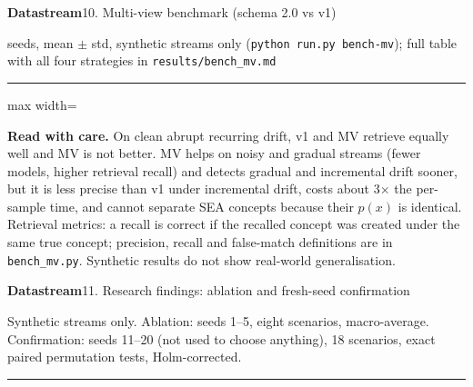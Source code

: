 \documentclass[10pt]{article}
\newcommand{\pagetitle}[2]{%
  {\Huge\bfseries Datastream}\hfill{\large #1}\par\vspace{2pt}
  {\large\color{ink!70} #2}\par\vspace{8pt}\hrule\vspace{14pt}}
\begin{document}
\pagetitle{10. Multi-view benchmark (schema 2.0 vs v1)}{\mvseeds{} seeds, mean $\pm$ std, synthetic streams only (\texttt{python run.py bench-mv}); full table with all four strategies in \texttt{results/bench\_mv.md}}

\begin{center}
\begin{adjustbox}{max width=\textwidth}

\end{adjustbox}
\end{center}
\vspace{6pt}
\begin{center}\end{center}
\vfill
{\footnotesize\color{ink!70}\textbf{Read with care.} On clean abrupt recurring drift, v1 and MV retrieve equally well and MV is not better. MV helps on noisy and gradual streams (fewer models, higher retrieval recall) and detects gradual and incremental drift sooner, but it is less precise than v1 under incremental drift, costs about 3$\times$ the per-sample time, and cannot separate SEA concepts because their $p(x)$ is identical. Retrieval metrics: a recall is correct if the recalled concept was created under the same true concept; precision, recall and false-match definitions are in \texttt{bench\_mv.py}. Synthetic results do not show real-world generalisation.}
\clearpage

\pagetitle{11. Research findings: ablation and fresh-seed confirmation}{Synthetic streams only. Ablation: seeds 1--5, eight scenarios, macro-average. Confirmation: seeds 11--20 (not used to choose anything), 18 scenarios, exact paired permutation tests, Holm-corrected.}
\end{document}

